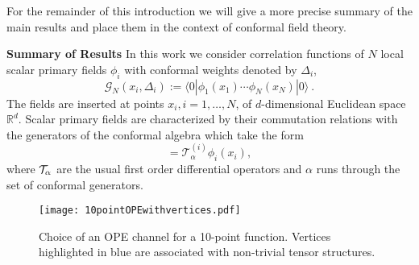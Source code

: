 \documentclass{article}
\def\cG{\mathcal{G}}
\begin{document}
For the remainder of this introduction we will give a more precise summary of the main 
results and place them in the context of conformal field theory. 
\medskip 

\noindent 
\textbf{Summary of Results} 
In this work we consider correlation functions of $N$ local scalar primary fields 
$\phi_i$ with conformal weights denoted by $\Delta_i$,  
\begin{equation}
\cG_N(x_i,\Delta_i) := \langle 0| \phi_1(x_1) \cdots \phi_N(x_N)| 0 \rangle \ .      
\end{equation}
The fields are inserted at points $x_i, i=1, \dots, N$, of $d$-dimensional 
Euclidean space $\mathbb{R}^d$. Scalar primary fields are characterized by their
commutation relations with the generators of the conformal algebra which take the 
form
\begin{equation} 
[T_\alpha,\phi_i(x_i)] = {\mathcal{T}}_{\alpha}^{(i)} \phi_i(x_i),
\end{equation} 
where $\cal{T}_\alpha$ are the usual first order differential operators 
 and $\alpha$ runs through the set of conformal generators. 

\begin{figure}[thb]
\centering
\texttt{[image: 10pointOPEwithvertices.pdf]}
\caption{Choice of an OPE channel for a 10-point function. Vertices highlighted in blue are associated with non-trivial tensor structures.}
\label{fig:10pointOPE}
\end{figure}
\end{document}
